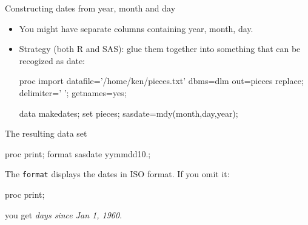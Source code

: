 \documentclass[unknownkeysallowed]{beamer}\usepackage[]{graphicx}\usepackage[]{color}
\begin{document}
\begin{frame}[fragile]{Constructing dates from year, month and day}
  
  \begin{itemize}
    
  \item You might have separate columns containing year, month, day.
  \item Strategy (both R and SAS): glue them together into something
    that can be recogized as date:
    \begin{Datastep}
proc import
  datafile='/home/ken/pieces.txt'
    dbms=dlm
    out=pieces
    replace;
  delimiter=' ';
  getnames=yes;
  
data makedates;
  set pieces;
  sasdate=mdy(month,day,year);
    \end{Datastep}
    
  \end{itemize}
  
\end{frame}

\begin{frame}[fragile]{The resulting data set}

    \begin{Sascode}[store=dd]
proc print;
  format sasdate yymmdd10.;
    \end{Sascode}


The \texttt{format} displays the dates in ISO format. If you omit it:

    \begin{Sascode}[store=dda]
proc print;
    \end{Sascode}


you get \emph{days since Jan 1, 1960}.
  
  
\end{frame}
\end{document}
